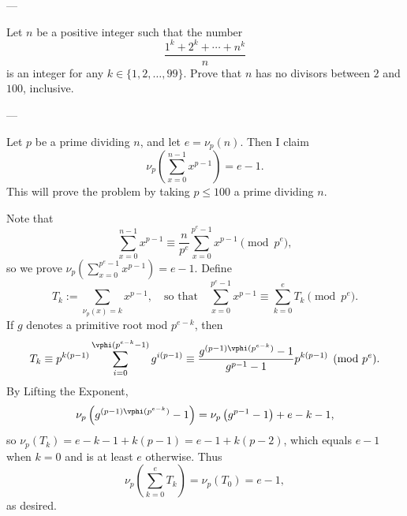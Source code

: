
---

Let $n$ be a positive integer such that the number \[\frac{1^k+2^k+\cdots+n^k}n\]
is an integer for any $k\in\{1,2,\ldots,99\}$. Prove that $n$ has no divisors between $2$ and $100$, inclusive.


---

Let $p$ be a prime dividing $n$, and let $e=\nu_p(n)$. Then I claim \[\nu_p\left(\sum_{x=0}^{n-1}x^{p-1}\right)=e-1.\]
This will prove the problem by taking $p\le100$ a prime dividing $n$.

Note that \[\sum_{x=0}^{n-1}x^{p-1}\equiv\frac n{p^e}\sum_{x=0}^{p^e-1}x^{p-1}\pmod{p^e},\]
so we prove $\nu_p\left(\sum_{x=0}^{p^e-1}x^{p-1}\right)=e-1$. Define \[T_k:=\sum_{\nu_p(x)=k}x^{p-1},\quad\text{so that}\quad\sum_{x=0}^{p^e-1}x^{p-1}\equiv\sum_{k=0}^eT_k\pmod{p^e}.\]
If $g$ denotes a primitive root mod $p^{e-k}$, then \[T_k\equiv p^{k(p-1)}\sum_{i=0}^{\vphi(p^{e-k}-1)}g^{i(p-1)}\equiv\frac{g^{(p-1)\vphi(p^{e-k})}-1}{g^{p-1}-1}p^{k(p-1)}\pmod{p^e}.\]
By Lifting the Exponent, \[\nu_p\left(g^{(p-1)\vphi(p^{e-k})}-1\right)=\nu_p\left(g^{p-1}-1\right)+e-k-1,\]
so $\nu_p(T_k)=e-k-1+k(p-1)=e-1+k(p-2)$, which equals $e-1$ when $k=0$ and is at least $e$ otherwise. Thus \[\nu_p\left(\sum_{k=0}^eT_k\right)=\nu_p(T_0)=e-1,\]
as desired.

